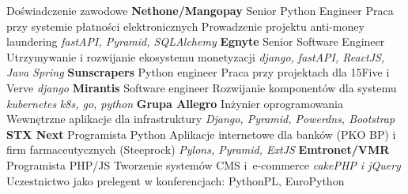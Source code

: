 \begin{rubric}{Doświadczenie zawodowe}
\entry*[IX 2023 -- X 2024]\textbf{Nethone/Mangopay}\newline
    Senior Python Engineer\newline
    Praca przy systemie płatności elektronicznych\newline
    Prowadzenie projektu anti-money laundering\newline
    \textit{fastAPI, Pyramid, SQLAlchemy}
\entry*[X 2019 -- VIII 2023]\textbf{Egnyte}\newline
    Senior Software Engineer\newline
    Utrzymywanie i rozwijanie ekosystemu monetyzacji\newline
    \textit{django, fastAPI, ReactJS, Java Spring}
\entry*[II 2017 -- IX 2019]\textbf{Sunscrapers}\newline
    Python engineer\newline
    Praca przy projektach dla 15Five i Verve\newline
    \textit{django}
\entry*[II 2016 -- I 2017]\textbf{Mirantis}\newline
    Software engineer\newline
    Rozwijanie komponentów dla systemu \textit{kubernetes}\newline
    \textit{k8s, go, python}
\entry*[X 2013 -- II 2016]\textbf{Grupa Allegro}\newline
    Inżynier oprogramowania\newline
    Wewnętrzne aplikacje dla infrastruktury\newline
    \textit{Django, Pyramid, Powerdns, Bootstrap}
\entry*[V 2011 -- IX 2013]\textbf{STX Next}\newline
    Programista Python\newline
    Aplikacje internetowe dla banków (PKO BP) i firm farmaceutycznych (Steeprock) \newline
    \textit{Pylons, Pyramid, ExtJS}
\entry*[VI 2009 -- IV 2011]\textbf{Emtronet/VMR}
    Programista PHP/JS\newline
    Tworzenie systemów CMS i~\hbox{e-commerce}\newline
    \textit{cakePHP i jQuery}
\entry*[inne]Uczestnictwo jako prelegent w konferencjach:\newline
    PythonPL, EuroPython
\end{rubric}

